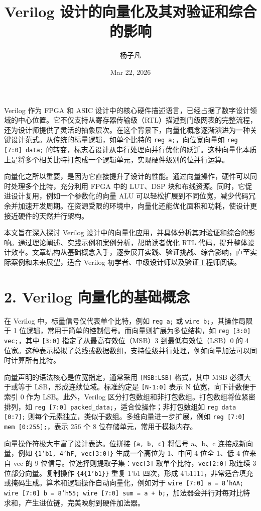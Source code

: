 \title{Verilog 设计的向量化及其对验证和综合的影响}
\author{杨子凡}
\date{Mar 22, 2026}
\maketitle
Verilog 作为 FPGA 和 ASIC 设计中的核心硬件描述语言，已经占据了数字设计领域的中心位置。它不仅支持从寄存器传输级（RTL）描述到门级网表的完整流程，还为设计师提供了灵活的抽象层次。在这个背景下，向量化概念逐渐演进为一种关键设计范式。从传统的标量逻辑，如单个比特的 \texttt{reg a;}，向位宽向量如 \texttt{reg [7:0] data;} 的转变，标志着设计从串行处理向并行优化的跃迁。这种向量化本质上是将多个相关比特打包成一个逻辑单元，实现硬件级别的位并行运算。\par
向量化之所以重要，是因为它直接提升了设计的性能。通过向量操作，硬件可以同时处理多个比特，充分利用 FPGA 中的 LUT、DSP 块和布线资源。同时，它促进设计复用，例如一个参数化的向量 ALU 可以轻松扩展到不同位宽，减少代码冗余并加速开发周期。在资源受限的环境中，向量化还能优化面积和功耗，使设计更接近硬件的天然并行架构。\par
本文旨在深入探讨 Verilog 设计中的向量化应用，并具体分析其对验证和综合的影响。通过理论阐述、实践示例和案例分析，帮助读者优化 RTL 代码，提升整体设计效率。文章结构从基础概念入手，逐步展开实践、验证挑战、综合影响，直至实际案例和未来展望，适合 Verilog 初学者、中级设计师以及验证工程师阅读。\par
\chapter{2. Verilog 向量化的基础概念}
在 Verilog 中，标量信号仅代表单个比特，例如 \texttt{reg a;} 或 \texttt{wire b;}，其操作局限于 1 位逻辑，常用于简单的控制信号。而向量则扩展为多位结构，如 \texttt{reg [3:0] vec;}，其中 \texttt{[3:0]} 指定了从最高有效位（MSB）3 到最低有效位（LSB）0 的 4 位宽。这种表示模拟了总线或数据数组，支持位级并行处理，例如向量加法可以同时计算所有比特。\par
向量声明的语法核心是位宽指定，通常采用 \texttt{[MSB:LSB]} 格式，其中 MSB 必须大于或等于 LSB，形成连续位域。标准约定是 \texttt{[N-1:0]} 表示 N 位宽，向下计数便于索引 0 作为 LSB。此外，Verilog 区分打包数组和非打包数组。打包数组将位紧密排列，如 \texttt{reg [7:0] packed\_{}data;}，适合位操作；非打包数组如 \texttt{reg data [0:7];} 则每个元素独立，类似于数组。多维向量进一步扩展，例如 \texttt{reg [7:0] mem [0:255];}，表示 256 个 8 位存储单元，常用于模拟内存。\par
向量操作符极大丰富了设计表达。位拼接 \texttt{\{{}a, b, c\}{}} 将信号 a、b、c 连接成新向量，例如 \texttt{\{{}1'b1, 4'hF, vec[3:0]\}{}} 生成一个高位为 1、中间 4 位全 1、低 4 位来自 vec 的 9 位信号。位选择则提取子集：\texttt{vec[3]} 取单个比特，\texttt{vec[2:0]} 取连续 3 位部分向量。复制操作 \texttt{\{{}4\{{}1'b1\}{}\}{}} 重复 1'b1 四次，形成 4'b1111，非常适合填充或掩码生成。算术和逻辑操作自动向量化，例如对于 \texttt{wire [7:0] a = 8'hAA; wire [7:0] b = 8'h55; wire [7:0] sum = a + b;}，加法器会并行对每对比特求和，产生进位链，完美映射到硬件加法器。\par
